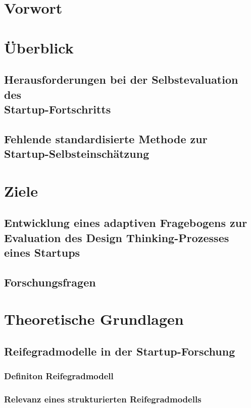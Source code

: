 \thispagestyle{fancy}
\chapter{Vorwort}
\chapter{Überblick}

\section{Herausforderungen bei der Selbstevaluation des \\ Startup-Fortschritts}


\section{Fehlende standardisierte Methode zur \\ Startup-Selbsteinschätzung}
\chapter{Ziele}

\section{Entwicklung eines adaptiven Fragebogens zur Evaluation des Design Thinking-Prozesses eines Startups}
\section{Forschungsfragen}


\chapter{Theoretische Grundlagen}

\section{Reifegradmodelle in der Startup-Forschung}
\subsection{Definiton Reifegradmodell}
\subsection{Relevanz eines strukturierten Reifegradmodells}
